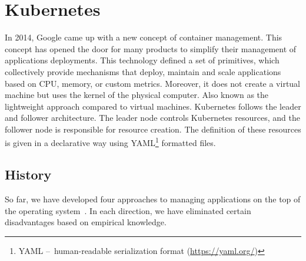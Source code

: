 \section{Kubernetes}
\label{01:sec:title}

In 2014, Google came up with a new concept of container management.
This concept has opened the door for many products to simplify their management of applications deployments.
This technology defined a set of primitives, which collectively provide mechanisms that deploy, maintain and scale applications based on CPU, memory, or custom metrics.
Moreover, it does not create a virtual machine but uses the kernel of the physical computer.
Also known as the lightweight approach compared to virtual machines.
Kubernetes follows the leader and follower architecture.
The leader node controls Kubernetes resources, and the follower node is responsible for resource creation.
The definition of these resources is given in a declarative way using YAML\footnote{YAML
\---\ human-readable serialization format (\url{https://yaml.org/})} formatted files.

\subsection{History}
\label{fig:history}

So far, we have developed four approaches to managing applications on the top of the operating system~\cite{history}.
In each direction, we have eliminated certain disadvantages based on empirical knowledge.

